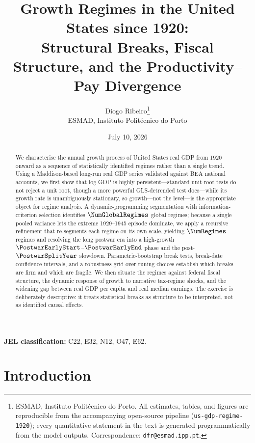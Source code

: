 \documentclass[11pt]{article}
\title{
  Growth Regimes in the United States since 1920:\\
  Structural Breaks, Fiscal Structure, and the Productivity--Pay Divergence
}
\author{
  Diogo Ribeiro\thanks{ESMAD, Instituto Polit\'{e}cnico do Porto. All estimates,
  tables, and figures are reproducible from the accompanying open-source pipeline
  (\texttt{us-gdp-regime-1920}); every quantitative statement in the text is
  generated programmatically from the model outputs. Correspondence:
  \texttt{dfr@esmad.ipp.pt}.}\\
  \small ESMAD, Instituto Polit\'{e}cnico do Porto
}
\date{July 10, 2026}
\begin{document}
\maketitle

\begin{abstract}
We characterise the annual growth process of United States real GDP from 1920
onward as a sequence of statistically identified regimes rather than a single
trend. Using a Maddison-based long-run real GDP series validated against BEA
national accounts, we first show that log GDP is highly persistent---standard
unit-root tests do not reject a unit root, though a more powerful GLS-detrended
test does---while its growth rate is unambiguously stationary, so growth---not
the level---is the appropriate object for regime analysis. A dynamic-programming
segmentation with information-criterion selection identifies $\NumGlobalRegimes$
global regimes; because a single pooled variance lets the extreme 1929--1945
episode dominate, we apply a recursive refinement that re-segments each regime on
its own scale, yielding $\NumRegimes$ regimes and resolving the long postwar era
into a high-growth $\PostwarEarlyStart$--$\PostwarEarlyEnd$ phase and the
post-$\PostwarSplitYear$ slowdown. Parametric-bootstrap break tests, break-date
confidence intervals, and a robustness grid over tuning choices establish which
breaks are firm and which are fragile. We then situate the regimes against
federal fiscal structure, the dynamic response of growth to narrative tax-regime
shocks, and the widening gap between real GDP per capita and real median
earnings. The exercise is deliberately descriptive: it treats statistical breaks
as structure to be interpreted, not as identified causal effects.
\end{abstract}


\vspace{0.3em}
\noindent\textbf{JEL classification:} C22, E32, N12, O47, E62.


\section{Introduction}
\end{document}
